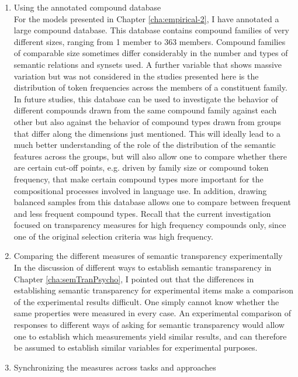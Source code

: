 \begin{enumerate}
\item {Using the annotated compound database} \label{using-annotations}\\
  For the models presented in Chapter \ref{cha:empirical-2}, I have
  annotated a large compound database. This database contains compound
  families of very different sizes, ranging from 1 member to 363
  members. Compound families of comparable size sometimes differ
  considerably in the number and types of semantic relations and
  synsets used. A further variable that shows massive variation but
  was not considered in the studies presented here is the distribution of
  token frequencies across the members of a constituent family. In
  future studies, this database can be used to investigate the
  behavior of different compounds drawn from the same compound family
  against each other but also against the behavior of compound types
  drawn from groups that differ along the dimensions just
  mentioned. This will ideally lead to a much better understanding of
  the role of the distribution of the semantic features across the
  groups, but will also allow one to compare whether there are certain
  cut-off points, e.g. driven by family size or compound token
  frequency, that make certain compound types more important for the
  compositional processes involved in language use. In addition, drawing balanced
  samples from this database allows one to compare between
  frequent and less frequent compound types. Recall that the current
  investigation focused on transparency measures for high frequency compounds only, since one
  of the original selection criteria was high frequency.
\item Comparing the different measures of semantic transparency
  experimentally\\
  In the discussion of different ways to establish semantic
  transparency in Chapter \ref{cha:semTranPsycho}, I pointed out that
  the differences in establishing semantic transparency for
  experimental items make a comparison of the experimental results
  difficult. One simply cannot know whether the same properties were
  measured in every case. An experimental comparison of responses to
  different ways of asking for semantic transparency would allow one to
  establish which measurements yield similar results, and
  can therefore be assumed to establish similar variables for
  experimental purposes.
\item Synchronizing the measures across tasks and approaches\\

\end{enumerate}
